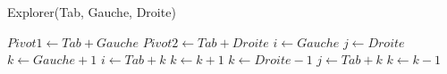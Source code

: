 \documentclass{article}
\begin{document}
\begin{algorithm}
    \begin{algorithmic}[1]
        \caption{Explorer(Tab, Gauche, Droite)}
        \State $ Pivot1 \gets Tab + Gauche $
        \State $ Pivot2 \gets Tab + Droite $
        \State $ i \gets Gauche $
        \State $ j \gets Droite $
        \State $ k \gets Gauche + 1 $
                    \State $ i \gets Tab + k $
                \EndIf
                \State $ k \gets k + 1 $
            \EndWhile
            \State $ k \gets Droite - 1 $
                    \State $ j \gets Tab + k $
                \EndIf
                \State $ k \gets k - 1 $
            \EndWhile
            \EndIf
        \EndWhile
    \end{algorithmic}
\end{algorithm}
\end{document}
